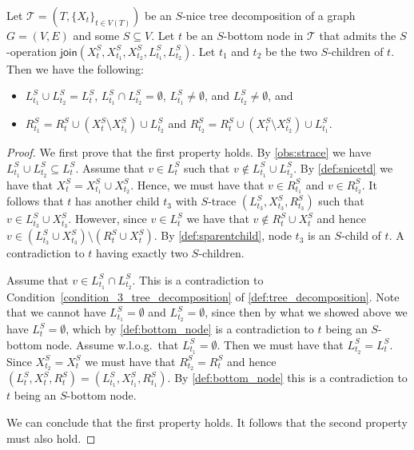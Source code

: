 \documentclass[a4paper,UKenglish,cleveref, autoref, thm-restate, numberwithinsect]{lipics-v2021}
\newcommand{\join}{\mathsf{join}}
\begin{document}
\begin{observation}\label{obs:join}
    Let $\mathcal{T}=(T,\{X_t\}_{t\in V(T)})$ be an $S$-nice tree decomposition of a graph $G=(V,E)$ and some $S\subseteq V$. Let $t$ be an $S$-bottom node in $\mathcal{T}$ that admits the $S$-operation $\join(X^S_t,X_{t_1}^S, X_{t_2}^S,L_{t_1}^S, L_{t_2}^S)$. Let $t_1$ and $t_2$ be the two $S$-children of $t$.
    Then we have the following:
    \begin{itemize}
        \item $L_{t_1}^S\cup L_{t_2}^S= L_{t}^S$, $L_{t_1}^S\cap L_{t_2}^S= \emptyset$, $L_{t_1}^S\neq\emptyset$, and $L_{t_2}^S\neq\emptyset$, and
\item $R_{t_1}^S=R_{t}^S\cup (X_t^S \setminus X_{t_1}^S)\cup L_{t_2}^S$ and $R_{t_2}^S=R_{t}^S\cup (X_t^S \setminus X_{t_2}^S)\cup L_{t_1}^S$.
    \end{itemize}
\end{observation}
\begin{proof}
We first prove that the first property holds.
By \cref{obs:strace} we have $L_{t_1}^S\cup L_{t_2}^S\subseteq L_{t}^S$. Assume that $v\in L_{t}^S$ such that $v\notin L_{t_1}^S\cup L_{t_2}^S$. 
By \cref{def:snicetd} we have that $X^S_t = X^S_{t_1}\cup X^S_{t_2}$.
Hence, we must have that $v\in R_{t_1}^S$ and $v\in R_{t_2}^S$. It follows that $t$ has another child $t_3$ with $S$-trace $(L_{t_3}^S, X_{t_3}^S, R_{t_3}^S)$ such that $v\in L_{t_3}^S \cup X_{t_3}^S$. However, since $v\in L_{t}^S$ we have that $v\notin R_{t}^S\cup X_{t}^S$ and hence $v\in (L_{t_3}^S \cup X_{t_3}^S)\setminus (R_{t}^S\cup X_{t}^S)$. By \cref{def:sparentchild}, node $t_3$ is an $S$-child of $t$. A contradiction to $t$ having exactly two $S$-children.

Assume that $v\in L_{t_1}^S\cap L_{t_2}^S$. This is a contradiction to Condition~\ref{condition_3_tree_decomposition} of \cref{def:tree_decomposition}.
Note that we cannot have $L_{t_1}^S=\emptyset$ and $L_{t_2}^S=\emptyset$, since then by what we showed above we have $L_{t}^S=\emptyset$, which by \cref{def:bottom_node} is a contradiction to $t$ being an $S$-bottom node. Assume w.l.o.g.\ that $L_{t_1}^S=\emptyset$. Then we must have that $L_{t_2}^S=L_{t}^S$. Since $X_{t_2}^S=X_{t}^S$ we must have that $R_{t_2}^S=R_{t}^S$ and hence $(L_{t}^S, X_{t}^S, R_{t}^S)=(L_{t_1}^S, X_{t_1}^S, R_{t_1}^S)$. By \cref{def:bottom_node} this is a contradiction to $t$ being an $S$-bottom node.

We can conclude that the first property holds. It follows that the second property must also hold.
\end{proof}
\end{document}
